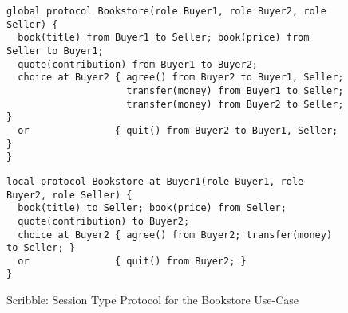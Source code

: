 \begin{figure}[t]
\begin{lstlisting}
global protocol Bookstore(role Buyer1, role Buyer2, role Seller) {
  book(title) from Buyer1 to Seller; book(price) from Seller to Buyer1;
  quote(contribution) from Buyer1 to Buyer2;
  choice at Buyer2 { agree() from Buyer2 to Buyer1, Seller;
                     transfer(money) from Buyer1 to Seller;
                     transfer(money) from Buyer2 to Seller; }
  or               { quit() from Buyer2 to Buyer1, Seller;  }
}
\end{lstlisting}


\begin{lstlisting}
local protocol Bookstore at Buyer1(role Buyer1, role Buyer2, role Seller) {
  book(title) to Seller; book(price) from Seller;
  quote(contribution) to Buyer2;
  choice at Buyer2 { agree() from Buyer2; transfer(money) to Seller; }
  or               { quit() from Buyer2; }
}
\end{lstlisting}
\vspace{-5mm}
\caption{Scribble: Session Type Protocol for the Bookstore Use-Case}
\label{fig:scribble_bs}
\vspace{-6mm}
\end{figure}
